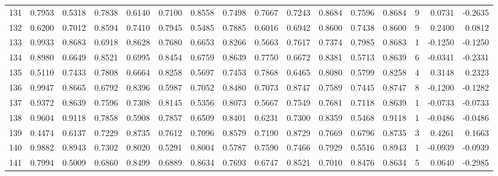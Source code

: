 \begin{tabular}{lrrrrrrrrrrrrrrr}
131 &      0.7953 &  0.5318 &  0.7838 &  0.6140 &  0.7100 &  0.8558 &  0.7498 &  0.7667 &  0.7243 &  0.8684 &   0.7596 &     0.8684 &      9 &                    0.0731 &                    -0.2635 \\
132 &      0.6200 &  0.7012 &  0.8594 &  0.7410 &  0.7945 &  0.5485 &  0.7885 &  0.6016 &  0.6942 &  0.8600 &   0.7438 &     0.8600 &      9 &                    0.2400 &                     0.0812 \\
133 &      0.9933 &  0.8683 &  0.6918 &  0.8628 &  0.7680 &  0.6653 &  0.8266 &  0.5663 &  0.7617 &  0.7374 &   0.7985 &     0.8683 &      1 &                   -0.1250 &                    -0.1250 \\
134 &      0.8980 &  0.6649 &  0.8521 &  0.6995 &  0.8454 &  0.6759 &  0.8639 &  0.7750 &  0.6672 &  0.8381 &   0.5713 &     0.8639 &      6 &                   -0.0341 &                    -0.2331 \\
135 &      0.5110 &  0.7433 &  0.7808 &  0.6664 &  0.8258 &  0.5697 &  0.7453 &  0.7868 &  0.6465 &  0.8080 &   0.5799 &     0.8258 &      4 &                    0.3148 &                     0.2323 \\
136 &      0.9947 &  0.8665 &  0.6792 &  0.8396 &  0.5987 &  0.7052 &  0.8480 &  0.7073 &  0.8747 &  0.7589 &   0.7445 &     0.8747 &      8 &                   -0.1200 &                    -0.1282 \\
137 &      0.9372 &  0.8639 &  0.7596 &  0.7308 &  0.8145 &  0.5356 &  0.8073 &  0.5667 &  0.7549 &  0.7681 &   0.7118 &     0.8639 &      1 &                   -0.0733 &                    -0.0733 \\
138 &      0.9604 &  0.9118 &  0.7858 &  0.5908 &  0.7857 &  0.6509 &  0.8401 &  0.6231 &  0.7300 &  0.8359 &   0.5468 &     0.9118 &      1 &                   -0.0486 &                    -0.0486 \\
139 &      0.4474 &  0.6137 &  0.7229 &  0.8735 &  0.7612 &  0.7096 &  0.8579 &  0.7190 &  0.8729 &  0.7669 &   0.6796 &     0.8735 &      3 &                    0.4261 &                     0.1663 \\
140 &      0.9882 &  0.8943 &  0.7302 &  0.8020 &  0.5291 &  0.8004 &  0.5787 &  0.7590 &  0.7466 &  0.7929 &   0.5516 &     0.8943 &      1 &                   -0.0939 &                    -0.0939 \\
141 &      0.7994 &  0.5009 &  0.6860 &  0.8499 &  0.6889 &  0.8634 &  0.7693 &  0.6747 &  0.8521 &  0.7010 &   0.8476 &     0.8634 &      5 &                    0.0640 &                    -0.2985 \\

\end{tabular}
